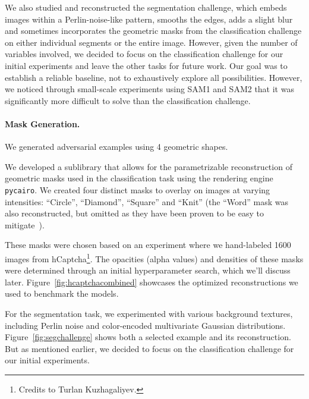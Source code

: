 \documentclass[a4paper, oneside]{discothesis}
\begin{document}
We also studied and reconstructed the segmentation challenge, which embeds images within a Perlin-noise-like pattern, smooths the edges, adds a slight blur and sometimes incorporates the geometric masks from the classification challenge on either individual segments or the entire image. However, given the number of variables involved, we decided to focus on the classification challenge for our initial experiments and leave the other tasks for future work. Our goal was to establish a reliable baseline, not to exhaustively explore all possibilities. However, we noticed through small-scale experiments using SAM1 and SAM2 that it was significantly more difficult to solve than the classification challenge.

\paragraph{Mask Generation.}

We generated adversarial examples using 4 geometric shapes.

We developed a sublibrary that allows for the parametrizable reconstruction of geometric masks used in the classification task using the rendering engine \texttt{pycairo}. We created four distinct masks to overlay on images at varying intensities: ``Circle'', ``Diamond'', ``Square'' and ``Knit'' (the ``Word'' mask was also reconstructed, but omitted as they have been proven to be easy to mitigate~\cite{zhang2023text,dong2023robust,shayegani2023plug}).

These masks were chosen based on an experiment where we hand-labeled 1600 images from hCaptcha\footnote{Credits to Turlan Kuzhagaliyev.}. The opacities (alpha values) and densities of these masks were determined through an initial hyperparameter search, which we'll discuss later. Figure~\ref{fig:hcaptchacombined} showcases the optimized reconstructions we used to benchmark the models.

For the segmentation task, we experimented with various background textures, including Perlin noise and color-encoded multivariate Gaussian distributions. Figure~\ref{fig:segchallenge} shows both a selected example and its reconstruction. But as mentioned earlier, we decided to focus on the classification challenge for our initial experiments.
\end{document}
